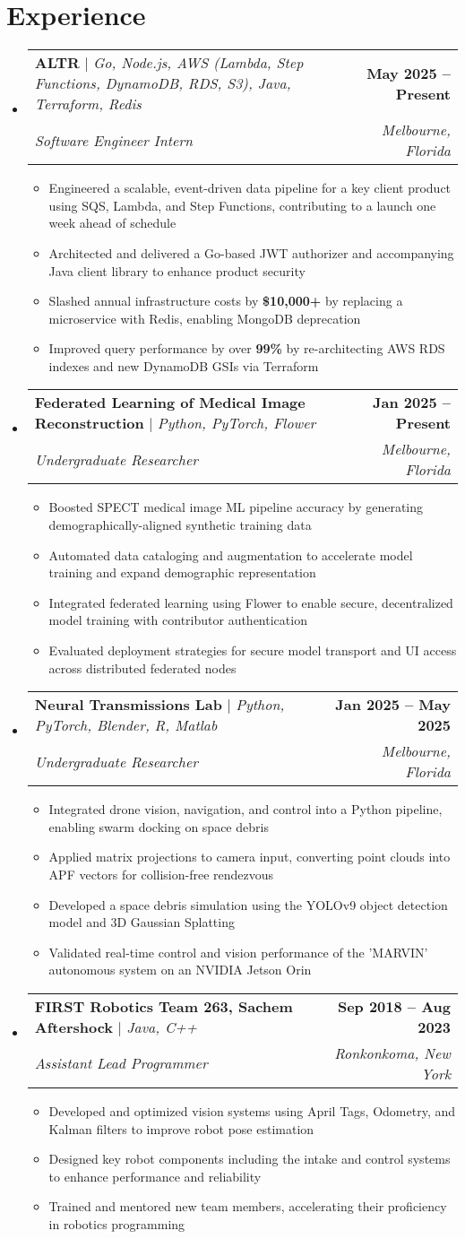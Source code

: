 \documentclass[letterpaper,11pt]{article}
\makeatletter
\newcommand{\resumeItem}[1]{
  \item\small{
    {#1 \vspace{-2pt}}
  }
}
\newcommand{\resumeSubheading}[4]{
  \vspace{-2pt}\item
    \begin{tabular*}{1.0\textwidth}[t]{l@{\extracolsep{\fill}}r}
      \small#1 & \textbf{\small #2} \\
      \textit{\small#3} & \textit{\small #4} \\
    \end{tabular*}\vspace{-9pt}
}
\newcommand{\resumeSubHeadingListStart}{\begin{itemize}[leftmargin=0.0in, label={}]}
\newcommand{\resumeSubHeadingListEnd}{\end{itemize}}
\newcommand{\resumeItemListStart}{\begin{itemize}}
\newcommand{\resumeItemListEnd}{\end{itemize}\vspace{-5pt}}
\makeatother
\begin{document}
\section{Experience}
  \resumeSubHeadingListStart
    \vspace{0pt}
    \resumeSubheading
    {\textbf{ALTR} $|$ \emph{Go, Node.js, AWS (Lambda, Step Functions, DynamoDB, RDS, S3), Java, Terraform, Redis}}{May 2025 -- Present}
    {Software Engineer Intern}{Melbourne, Florida}
    \resumeItemListStart
      \resumeItem{Engineered a scalable, event-driven data pipeline for a key client product using SQS, Lambda, and Step Functions, contributing to a launch one week ahead of schedule}
      \resumeItem{Architected and delivered a Go-based JWT authorizer and accompanying Java client library to enhance product security}
      \resumeItem{Slashed annual infrastructure costs by \textbf{\$10,000+} by replacing a microservice with Redis, enabling MongoDB deprecation}
      \resumeItem{Improved query performance by over \textbf{99\%} by re-architecting AWS RDS indexes and new DynamoDB GSIs via Terraform}
    \resumeItemListEnd
  \resumeSubheading
    {\textbf{Federated Learning of Medical Image Reconstruction} $|$ \emph{Python, PyTorch, Flower}}{Jan 2025 -- Present}
    {Undergraduate Researcher}{Melbourne, Florida}
    \resumeItemListStart
      \resumeItem{Boosted SPECT medical image ML pipeline accuracy by generating demographically-aligned synthetic training data}
      \resumeItem{Automated data cataloging and augmentation to accelerate model training and expand demographic representation}
      \resumeItem{Integrated federated learning using Flower to enable secure, decentralized model training with contributor authentication}
      \resumeItem{Evaluated deployment strategies for secure model transport and UI access across distributed federated nodes}
    \resumeItemListEnd
  \resumeSubheading
    {\textbf{Neural Transmissions Lab} $|$ \emph{Python, PyTorch, Blender, R, Matlab}}{Jan 2025 -- May 2025}      
    {Undergraduate Researcher}{Melbourne, Florida}
    \resumeItemListStart
      \resumeItem{Integrated drone vision, navigation, and control into a Python pipeline, enabling swarm docking on space debris}
      \resumeItem{Applied matrix projections to camera input, converting point clouds into APF vectors for collision-free rendezvous}
      \resumeItem{Developed a space debris simulation using the YOLOv9 object detection model and 3D Gaussian Splatting}
      \resumeItem{Validated real-time control and vision performance of the 'MARVIN' autonomous system on an NVIDIA Jetson Orin}
    \resumeItemListEnd
  \resumeSubheading
    {\textbf{FIRST Robotics Team 263, Sachem Aftershock} $|$ \emph{Java, C++}}{Sep 2018 -- Aug 2023}
    {Assistant Lead Programmer}{Ronkonkoma, New York}
    \resumeItemListStart
      \resumeItem{Developed and optimized vision systems using April Tags, Odometry, and Kalman filters to improve robot pose estimation}
      \resumeItem{Designed key robot components including the intake and control systems to enhance performance and reliability}
      \resumeItem{Trained and mentored new team members, accelerating their proficiency in robotics programming}
    \resumeItemListEnd
\resumeSubHeadingListEnd
\end{document}
